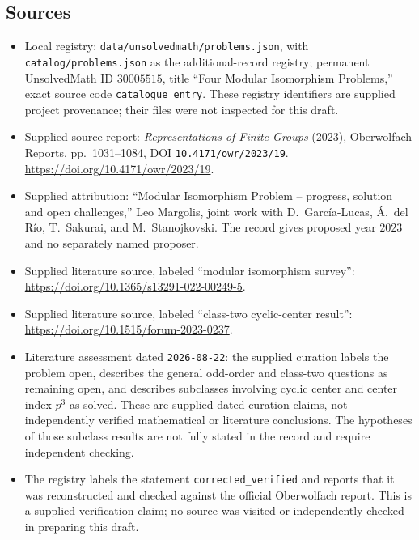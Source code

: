 \documentclass[11pt]{article}
\begin{document}
\subsection{Sources}
\begin{itemize}
\item Local registry: \texttt{data/unsolvedmath/problems.json}, with \texttt{catalog/problems.json} as the additional-record registry; permanent UnsolvedMath ID \(30005515\), title ``Four Modular Isomorphism Problems,'' exact source code \texttt{catalogue entry}. These registry identifiers are supplied project provenance; their files were not inspected for this draft.
\item Supplied source report: \emph{Representations of Finite Groups} (2023), Oberwolfach Reports, pp.~1031--1084, DOI \texttt{10.4171/owr/2023/19}. \url{https://doi.org/10.4171/owr/2023/19}.
\item Supplied attribution: ``Modular Isomorphism Problem -- progress, solution and open challenges,'' Leo Margolis, joint work with D.~Garc\'{i}a-Lucas, \'{A}.~del R\'{i}o, T.~Sakurai, and M.~Stanojkovski. The record gives proposed year \(2023\) and no separately named proposer.
\item Supplied literature source, labeled ``modular isomorphism survey'': \url{https://doi.org/10.1365/s13291-022-00249-5}.
\item Supplied literature source, labeled ``class-two cyclic-center result'': \url{https://doi.org/10.1515/forum-2023-0237}.
\item Literature assessment dated \texttt{2026-08-22}: the supplied curation labels the problem open, describes the general odd-order and class-two questions as remaining open, and describes subclasses involving cyclic center and center index \(p^3\) as solved. These are supplied dated curation claims, not independently verified mathematical or literature conclusions. The hypotheses of those subclass results are not fully stated in the record and require independent checking.
\item The registry labels the statement \texttt{corrected\_verified} and reports that it was reconstructed and checked against the official Oberwolfach report. This is a supplied verification claim; no source was visited or independently checked in preparing this draft.
\end{itemize}
\end{document}
